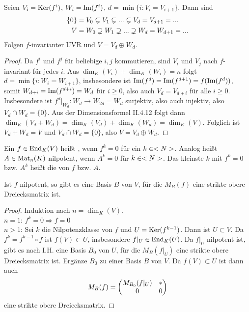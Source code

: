 \begin{proposition}
	Seien $V_i=\operatorname{Ker}(f^i)$, $W_i=\operatorname{Im}(f^i)$, $d=\min\{i:V_i=V_{i+1}\}$. Dann sind 
	\begin{align}
		\{0\}&=V_0\subsetneq V_1\subsetneq ...\subsetneq V_d=V_{d+1}=...\notag \\
		V&= W_0\supsetneq W_1\supsetneq ... \supsetneq W_d=W_{d+1}=...\notag
	\end{align}
	Folgen $f$-invarianter UVR und $V=V_d\oplus W_d$.
\end{proposition}
\begin{proof}
	Da $f^i$ und $f^j$ für beliebige $i,j$ kommutieren, sind $V_i$ und $V_j$ nach  $f$-invariant für jedes $i$. Aus $\dim_K(V_i)+\dim_K(W_i)=n$ folgt $d=\min\{i:W_i=W_{i+1}\}$, insbesondere ist $\operatorname{Im}(f^d)=\operatorname{Im}(f^{d+1})=f(\operatorname{Im}(f^d))$, somit $W_{d+i}=\operatorname{Im}(f^{d+i})=W_d$ für $i\ge 0$, also auch $V_d=V_{d+i}$ für alle $i\ge 0$. \\
	Insbesondere ist $f^d\vert_{W_d}:W_d\to W_{2d}=W_d$ surjektiv, also auch injektiv, also $V_d\cap W_d=\{0\}$. Aus der Dimensionsformel II.4.12 folgt dann $\dim_K(V_d+W_d)=\dim_K(V_d)+\dim_K(W_d)=\dim_K(V)$. Folglich ist $V_d+W_d=V$ und $V_d\cap W_d=\{0\}$, also $V=V_d\oplus W_d$.
\end{proof}

\begin{definition}[nilpotent]
	Ein $f\in\operatorname{End}_K(V)$ heißt , wenn $f^k=0$ für ein $k\in<N>$. Analog heißt $A\in\operatorname{Mat}_n(K)$ nilpotent, wenn $A^k=0$ für $k\in<N>$. Das kleinste $k$ mit $f^k=0$ bzw. $A^k$ heißt die  von $f$ bzw. $A$.
\end{definition}

\begin{lemma}
	Ist $f$ nilpotent, so gibt es eine Basis $B$ von $V$, für die $M_B(f)$ eine strikte obere Dreiecksmatrix ist.
\end{lemma}
\begin{proof}
	Induktion nach $n=\dim_K(V)$. \\
	\emph{$n=1$}: $f^k=0\Rightarrow f=0$ \\
	\emph{$n>1$}: Sei $k$ die Nilpotenzklasse von $f$ und $U=\operatorname{Ker}(f^{k-1})$. Dann ist $U\subset V$. Da $f^k=f^{k-1}\circ f$ ist $f(V)\subset U$, insbesondere $f\vert_U\in\operatorname{End}_K(U)$. Da $f\vert_U$ nilpotent ist, gibt es nach I.H. eine Basis $B_0$ von $U$, für die $M_B(f\vert_U)$ eine strikte obere Dreiecksmatrix ist. Ergänze $B_0$ zu einer Basis $B$ von $V$. Da $f(V)\subset U$ ist dann auch 
	\begin{align}
		M_B(f)=\begin{pmatrix}M_{B_0}(f\vert_U)&*\\0&0\end{pmatrix}\notag
	\end{align}
	eine strikte obere Dreiecksmatrix.
\end{proof}

